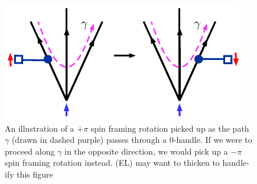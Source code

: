 \documentclass[12pt,a4paper]{article}
\newcommand{\cc}{\mathbb{C}}
\newcommand{\ethan}[1]{{\color{amethyst}\footnotesize{(EL) #1}}}
\newcommand{\kw}[1]{{\color{kwcolor}\footnotesize{(KW) #1}}}
\begin{document}

\medskip

\begin{figure}
\begin{center}
\includegraphics{spin_rot_through_0handle.pdf}
\caption{ \label{spin_rot_through_0handle} An illustration of a $+\pi$ spin framing rotation picked up as the path $\gamma$ (drawn in dashed purple) passes through a 0-handle. 
If we were to proceed along $\gamma$ in the opposite direction, we would pick up a $-\pi$ spin framing rotation instead. \ethan{may want to thicken to handle-ify this figure}
  }
\end{center}
\end{figure}
\end{document}
